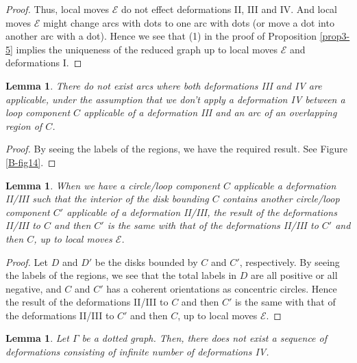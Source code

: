 \documentclass[a4paper,11pt]{amsart}
\numberwithin{equation}{section}
\newtheorem{lemma}[theorem]{Lemma}
\begin{document}
\begin{proof}
Thus, local moves $\mathcal{E}$ do not effect deformations II, III  and IV.  
And local moves $\mathcal{E}$ might change arcs with dots to one arc with dots (or move a dot into another arc with a dot). Hence 
we see that (1) in the proof of Proposition \ref{prop3-5} implies the uniqueness of the reduced graph up to local moves $\mathcal{E}$ and deformations I. 
\end{proof}

\begin{lemma}\label{lem913}
There do not exist arcs where both deformations III and IV are applicable, under the assumption that we don't apply a deformation IV between a loop component $C$ applicable of a deformation III and an arc of an overlapping region of $C$. 
\end{lemma}
\begin{proof}
By seeing the labels of the regions, we have the required result. 
See Figure \ref{B-fig14}. 
\end{proof}

\begin{lemma}\label{lem912}
When we have a circle/loop component $C$ applicable a deformation II/III  such that the interior of the disk bounding $C$ contains another circle/loop component $C'$ applicable of a deformation II/III, the result of the deformations II/III to $C$ and then $C'$ is the same with that of the deformations II/III to $C'$ and then $C$, up to local moves $\mathcal{E}$. 
\end{lemma}

\begin{proof}
Let $D$ and $D'$ be the disks bounded by $C$ and $C'$, respectively. 
By seeing the labels of the regions, we see that the total labels in $D$ are all positive or all negative, and $C$ and $C'$ has a coherent orientations as concentric circles. Hence the result of the deformations II/III to $C$ and then $C'$ is the same with that of the deformations II/III to $C'$ and then $C$, up to local moves $\mathcal{E}$. 
\end{proof}

\begin{lemma}\label{lem826}
 Let  $\Gamma$ be a dotted graph. Then, there does not exist a sequence of deformations consisting of 
infinite number of deformations IV.  
\end{lemma}
\end{document}
